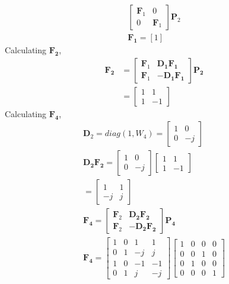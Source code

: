 \documentclass[journal,12pt,twocolumn]{IEEEtran}
\providecommand{\sbrak}[1]{\ensuremath{\left[#1\right]}}
\let\vec\mathbf
\numberwithin{equation}{section}
\renewcommand\thesection{\arabic{section}}
\begin{document}
\begin{enumerate}[label=\arabic*.,ref=\thesection.\theenumi]
\begin{align}
\begin{bmatrix}
\vec{F}_{1} & 0 \\
0 & \vec{F}_{1}
\end{bmatrix}
\vec{P}_{2}\\
\vec{F_1}=\sbrak{1}
\end{align}
Calculating $\vec{F_2}$,
\begin{align}
\vec{F_2}&=\begin{bmatrix}
\vec{F}_{1} & \vec{D_1F_1} \\
\vec{F}_{1} & -\vec{D_1F_1}
\end{bmatrix}\vec{P_2}\\
&=\begin{bmatrix}1&1\\1&-1\end{bmatrix}
\end{align}
Calculating $\vec{F_4}$,
\begin{align}
\vec{D}_{2}=diag(1,W_4)
=\begin{bmatrix}
1&0\\0&-j
\end{bmatrix}\\
\vec{D_2F_2}=\begin{bmatrix}
1&0\\0&-j
\end{bmatrix}\begin{bmatrix}
1&1\\1&-1
\end{bmatrix}\\
=\begin{bmatrix}
1&1\\-j&j
\end{bmatrix}\\
\vec{F_4}=\begin{bmatrix}
\vec{F}_{2} & \vec{D_2F_2} \\
\vec{F}_{2} & -\vec{D_2F_2}
\end{bmatrix}\vec{P_4}\\
\vec{F_4}=\begin{bmatrix}
1&0&1&1\\0&1&-j&j\\1&0&-1&-1\\0&1&j&-j
\end{bmatrix}\begin{bmatrix}
1&0&0&0\\0&0&1&0\\0&1&0&0\\0&0&0&1
\end{bmatrix}\\

\end{align}
\end{enumerate}
\end{document}
